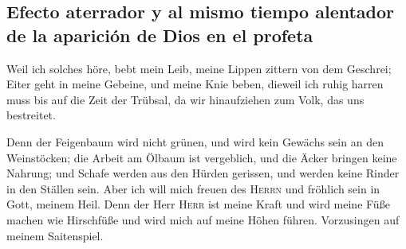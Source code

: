 \hypertarget{efecto-aterrador-y-al-mismo-tiempo-alentador-de-la-apariciuxf3n-de-dios-en-el-profeta}{%
\subsection{Efecto aterrador y al mismo tiempo alentador de la aparición
de Dios en el
profeta}\label{efecto-aterrador-y-al-mismo-tiempo-alentador-de-la-apariciuxf3n-de-dios-en-el-profeta}}

 Weil ich solches höre, bebt mein Leib, meine Lippen
zittern von dem Geschrei; Eiter geht in meine Gebeine, und meine Knie
beben, dieweil ich ruhig harren muss bis auf die Zeit der Trübsal, da
wir hinaufziehen zum Volk, das uns bestreitet.

 Denn der Feigenbaum wird nicht grünen, und wird kein
Gewächs sein an den Weinstöcken; die Arbeit am Ölbaum ist vergeblich,
und die Äcker bringen keine Nahrung; und Schafe werden aus den Hürden
gerissen, und werden keine Rinder in den Ställen sein. 
Aber ich will mich freuen des \textsc{Herrn} und fröhlich sein in Gott,
meinem Heil.  Denn der Herr \textsc{Herr} ist meine Kraft
und wird meine Füße machen wie Hirschfüße und wird mich auf meine Höhen
führen. Vorzusingen auf meinem Saitenspiel.
